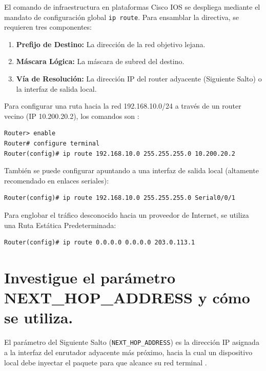 \documentclass[a4paper,12pt]{article}
\begin{document}
El comando de infraestructura en plataformas Cisco IOS se despliega mediante el mandato de configuración global \texttt{ip route}. Para ensamblar la directiva, se requieren tres componentes:
\begin{enumerate}
    \item \textbf{Prefijo de Destino:} La dirección de la red objetivo lejana.
    \item \textbf{Máscara Lógica:} La máscara de subred del destino.
    \item \textbf{Vía de Resolución:} La dirección IP del router adyacente (Siguiente Salto) o la interfaz de salida local.
\end{enumerate}

Para configurar una ruta hacia la red 192.168.10.0/24 a través de un router vecino (IP 10.200.20.2), los comandos son \cite{ccnadesdecero_static}:

\begin{lstlisting}
Router> enable
Router# configure terminal
Router(config)# ip route 192.168.10.0 255.255.255.0 10.200.20.2
\end{lstlisting}

También se puede configurar apuntando a una interfaz de salida local (altamente recomendado en enlaces seriales):

\begin{lstlisting}
Router(config)# ip route 192.168.10.0 255.255.255.0 Serial0/0/1
\end{lstlisting}

Para englobar el tráfico desconocido hacia un proveedor de Internet, se utiliza una Ruta Estática Predeterminada:

\begin{lstlisting}
Router(config)# ip route 0.0.0.0 0.0.0.0 203.0.113.1
\end{lstlisting}

\newpage

\section{Investigue el parámetro NEXT\_HOP\_ADDRESS y cómo se utiliza.}

El parámetro del Siguiente Salto (\texttt{NEXT\_HOP\_ADDRESS}) es la dirección IP asignada a la interfaz del enrutador adyacente más próximo, hacia la cual un dispositivo local debe inyectar el paquete para que alcance su red terminal \cite{moreluznet_nexthop}.
\end{document}
